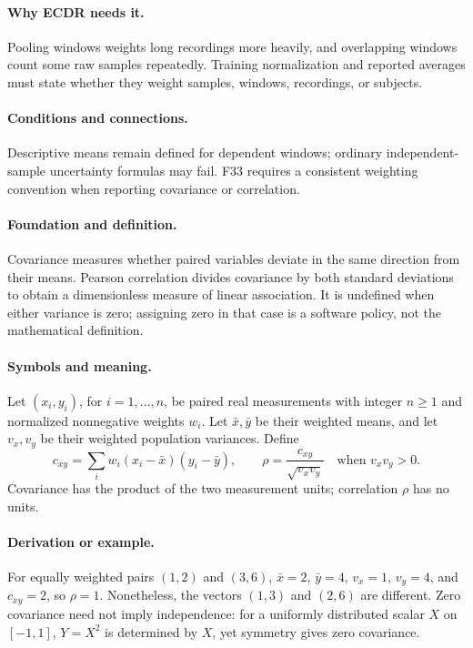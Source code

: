 \paragraph{Why ECDR needs it.}
Pooling windows weights long recordings more heavily, and overlapping
windows count some raw samples repeatedly. Training normalization and
reported averages must state whether they weight samples, windows,
recordings, or subjects.
\paragraph{Conditions and connections.}
Descriptive means remain defined for dependent windows; ordinary
independent-sample uncertainty formulas may fail. F33 requires a
consistent weighting convention when reporting covariance or correlation.

\paragraph{Foundation and definition.}
Covariance measures whether paired variables deviate in the same
direction from their means. Pearson correlation divides covariance by
both standard deviations to obtain a dimensionless measure of linear
association. It is undefined when either variance is zero; assigning
zero in that case is a software policy, not the mathematical definition.
\paragraph{Symbols and meaning.}
Let $(x_i,y_i)$, for $i=1,\ldots,n$, be paired real measurements with
integer $n\ge1$ and normalized nonnegative weights $w_i$. Let
$\bar x,\bar y$ be their weighted means, and let $v_x,v_y$ be their
weighted population variances. Define
\[
 c_{xy}=\sum_i w_i(x_i-\bar x)(y_i-\bar y),
 \qquad \rho=\frac{c_{xy}}{\sqrt{v_xv_y}}
 \quad\text{when }v_xv_y>0.
\]
Covariance has the product of the two measurement units; correlation
$\rho$ has no units.
\paragraph{Derivation or example.}
For equally weighted pairs $(1,2)$ and $(3,6)$,
$\bar x=2$, $\bar y=4$, $v_x=1$, $v_y=4$, and $c_{xy}=2$,
so $\rho=1$. Nonetheless, the vectors $(1,3)$ and $(2,6)$ are
different. Zero covariance need not imply independence: for a uniformly
distributed scalar $X$ on $[-1,1]$, $Y=X^2$ is determined by $X$,
yet symmetry gives zero covariance.

